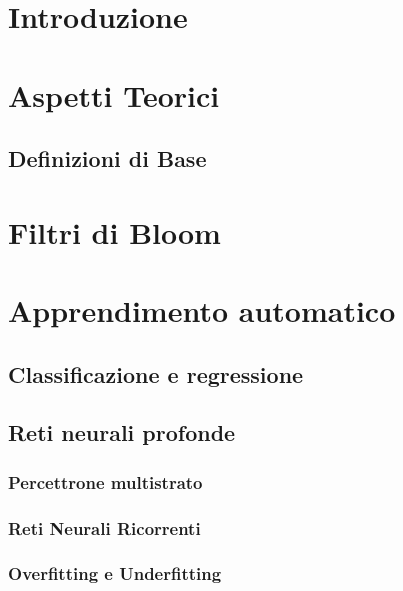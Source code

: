 \documentclass[4apaper,11pt]{report}
\begin{document}
\tableofcontents

\chapter{Introduzione}

\chapter{Aspetti Teorici}
\section{Definizioni di Base}

\chapter{Filtri di Bloom}
\label{chap:FiltriBloom}

\chapter{Apprendimento automatico}

\section{Classificazione e regressione}

\section{Reti neurali profonde} %

\subsection{Percettrone multistrato}

\subsection{Reti Neurali Ricorrenti}
\label{sec:retiRicorrenti}

\subsection{Overfitting e Underfitting}
\label{sec:overfitting}

\end{document}
